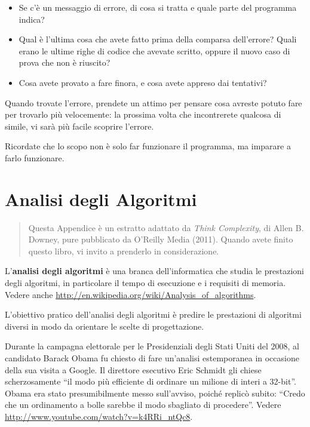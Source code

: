 \documentclass[10pt]{book}
\begin{document}
\begin{itemize}

\item Se c'è un messaggio di errore, di cosa si tratta e quale parte del programma indica?

\item Qual è l'ultima cosa che avete fatto prima della comparsa dell'errore? Quali erano le ultime righe di codice che avevate scritto, oppure il nuovo caso di prova che non è riuscito?

\item Cosa avete provato a fare finora, e cosa avete appreso dai tentativi?

\end{itemize}

Quando trovate l'errore, prendete un attimo per pensare cosa avreste potuto fare per trovarlo più velocemente: la prossima volta che incontrerete qualcosa di simile, vi sarà più facile scoprire l'errore.

Ricordate che lo scopo non è solo far funzionare il programma, ma imparare a farlo funzionare.


\chapter{Analisi degli Algoritmi}

\begin{quote}
Questa Appendice è un estratto adattato da {\it Think Complexity}, di
Allen B. Downey, pure pubblicato da O'Reilly Media (2011).  Quando avete finito questo libro, vi invito a prenderlo in considerazione.
\end{quote}

L'{\bf analisi degli algoritmi} è una branca dell'informatica che studia le prestazioni degli algoritmi, in particolare il tempo di esecuzione e i requisiti di memoria. Vedere anche
\url{http://en.wikipedia.org/wiki/Analysis_of_algorithms}.
 

L'obiettivo pratico dell'analisi degli algoritmi è predire le prestazioni di algoritmi diversi in modo da orientare le scelte di progettazione.

Durante la campagna elettorale per le Presidenziali degli Stati Uniti del 2008, al candidato Barack Obama fu chiesto di fare un'analisi estemporanea in occasione della sua visita a Google. Il direttore esecutivo Eric Schmidt gli chiese scherzosamente ``il modo più efficiente di ordinare un milione di interi a 32-bit''.
Obama era stato presumibilmente messo sull'avviso, poiché replicò subito: ``Credo che un ordinamento a bolle sarebbe il modo sbagliato di procedere''.
Vedere \url{http://www.youtube.com/watch?v=k4RRi_ntQc8}.
\end{document}
